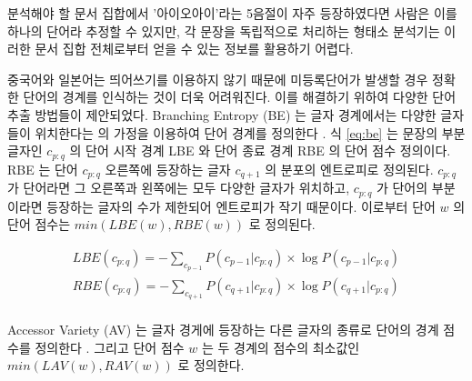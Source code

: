 \documentclass[oneside, ko,phd]{snuthesis_utf8_kor}
\begin{document}
\begin{table}[ht]
\centering
\caption{기학습된 한국어 형태소 분석기를 이용한 문장 분석 예시. (N: 명사, J: 조사, V: 동사, E: 어미, VCP: 동사형 전성어미)}
\label{tab:ioisentence_postagging_example}
\end{table}

분석해야 할 문서 집합에서 '아이오아이'라는 5음절이 자주 등장하였다면 사람은 이를 하나의 단어라 추정할 수 있지만, 각 문장을 독립적으로 처리하는 형태소 분석기는 이러한 문서 집합 전체로부터 얻을 수 있는 정보를 활용하기 어렵다.

중국어와 일본어는 띄어쓰기를 이용하지 않기 때문에 미등록단어가 발생할 경우 정확한 단어의 경계를 인식하는 것이 더욱 어려워진다.
이를 해결하기 위하여 다양한 단어 추출 방법들이 제안되었다.
Branching Entropy (BE) 는 글자 경계에서는 다양한 글자들이 위치한다는 \cite{harris1954distributional} 의 가정을 이용하여 단어 경계를 정의한다 \cite{jin2006unsupervised}.
식 \ref{eq:be} 는 문장의 부분글자인 $c_{p:q}$ 의 단어 시작 경계 LBE 와 단어 종료 경계 RBE 의 단어 점수 정의이다.
RBE 는 단어 $c_{p:q}$ 오른쪽에 등장하는 글자 $c_{q+1}$ 의 분포의 엔트로피로 정의된다.
$c_{p:q}$ 가 단어라면 그 오른쪽과 왼쪽에는 모두 다양한 글자가 위치하고, $c_{p:q}$ 가 단어의 부분이라면 등장하는 글자의 수가 제한되어 엔트로피가 작기 때문이다.
이로부터 단어 $w$ 의 단어 점수는 $min(LBE(w), RBE(w))$ 로 정의된다.

\begin{equation}
\label{eq:be}
\begin{aligned}
LBE(c_{p:q}) = - \sum_{c_{p-1}} P(c_{p-1} \vert c_{p:q}) \times \log P(c_{p-1} \vert c_{p:q}) \\
RBE(c_{p:q}) = - \sum_{c_{q+1}} P(c_{q+1} \vert c_{p:q}) \times \log P(c_{q+1} \vert c_{p:q}) \\
\end{aligned}
\end{equation}

Accessor Variety (AV) 는 글자 경게에 등장하는 다른 글자의 종류로 단어의 경계 점수를 정의한다 \cite{feng2004accessor}.
그리고 단어 점수 $w$ 는 두 경계의 점수의 최소값인 $min(LAV(w), RAV(w))$ 로 정의한다.
\end{document}
